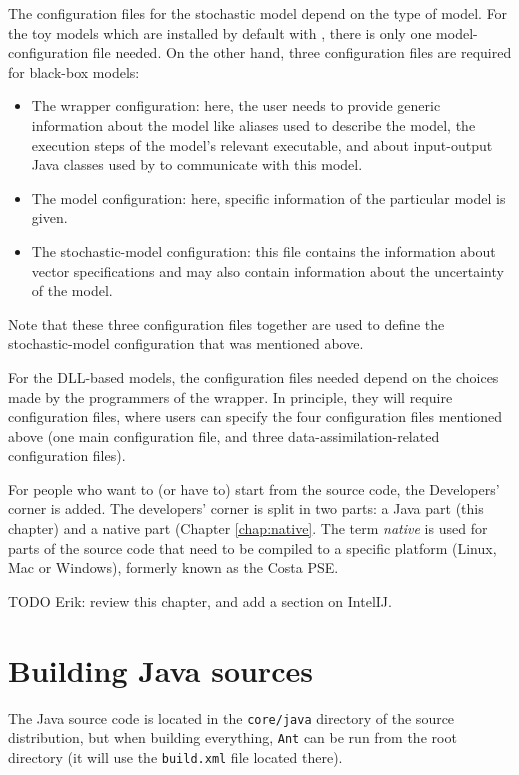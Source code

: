 The configuration files for the stochastic model depend on the type of model. For the toy models which are installed by default with \oda, there is only one model-configuration file needed. On the other hand, three configuration files are required for black-box models: 
\begin{itemize}
\item The wrapper configuration: here, the user needs to provide generic information about the model like aliases used to describe the model, the execution steps of the model’s relevant executable, and about input-output Java classes used by \oda to communicate with this model.
\item The model configuration: here, specific information of the particular model is given.
\item The stochastic-model configuration: this file contains the information about vector specifications and may also contain information about the uncertainty of the model. 
\end{itemize}
Note that these three configuration files together are used to define the stochastic-model configuration that was mentioned above.

For the DLL-based models, the configuration files needed depend on the choices made by the programmers of the \oda wrapper. In principle, they will require configuration files, where users can specify the four configuration files mentioned above (one main configuration file, and three data-assimilation-related configuration files). 



\label{chap:Java}
For people who want to (or have to) start from the \oda source code, the Developers' corner is added. The developers' corner is split in two parts: a Java part (this chapter) and a native part (Chapter \ref{chap:native}. The term \emph{native} is used for parts of the source code that need to be compiled to a specific platform (Linux, Mac or Windows), formerly known as the Costa PSE.

TODO Erik: review this chapter, and add a section on IntelIJ.

\section{Building Java sources}
The \oda Java source code is located in the \verb|core/java| directory of the source distribution, but when building everything, \verb|Ant| can be run from the \oda root directory (it will use the \verb|build.xml| file located there).

